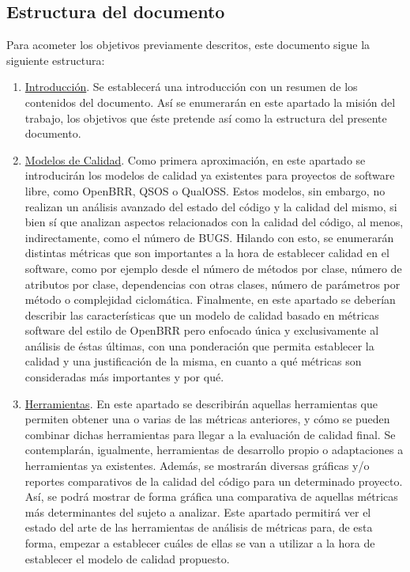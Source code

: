 \documentclass[11pt]{article}
\begin{document}
\subsection{Estructura del documento}
Para acometer los objetivos previamente descritos, este documento sigue la siguiente estructura:

\begin{enumerate}
\item{\underline{Introducción}}. Se establecerá una introducción con un resumen de los contenidos del documento. Así se enumerarán en este apartado la misión del trabajo, los objetivos que éste pretende así como la estructura del presente documento.
\item{\underline{Modelos de Calidad}}. Como primera aproximación, en este apartado se introducirán los modelos de calidad ya existentes para proyectos de software libre, como OpenBRR, QSOS o QualOSS. Estos modelos, sin embargo, no realizan un análisis avanzado del estado del código y la calidad del mismo, si bien sí que analizan aspectos relacionados con la calidad del código, al menos, indirectamente, como el número de BUGS.
Hilando con esto, se enumerarán distintas métricas que son importantes a la hora de establecer calidad en el software, como por ejemplo desde el número de métodos por clase, número de atributos por clase, dependencias con otras clases, número de parámetros por método o complejidad ciclomática.
Finalmente, en este apartado se deberían describir las características que un modelo de calidad basado en métricas software del estilo de OpenBRR pero enfocado única y exclusivamente al análisis de éstas últimas, con una ponderación que permita establecer la calidad y una justificación de la misma, en cuanto a qué métricas son consideradas más importantes y por qué.
\item{\underline{Herramientas}}. En este apartado se describirán aquellas herramientas que permiten obtener una o varias de las métricas anteriores, y cómo se pueden combinar dichas herramientas para llegar a la evaluación de calidad final. Se contemplarán, igualmente, herramientas de desarrollo propio o adaptaciones a herramientas ya existentes. 
Además, se mostrarán diversas gráficas y/o reportes comparativos de la calidad del código para un determinado proyecto. Así, se podrá mostrar de forma gráfica una comparativa de aquellas métricas más determinantes del sujeto a analizar.
Este apartado permitirá ver el estado del arte de las herramientas de análisis de métricas para, de esta forma, empezar a establecer cuáles de ellas se van a utilizar a la hora de establecer el modelo de calidad propuesto.

\end{enumerate}
\end{document}
